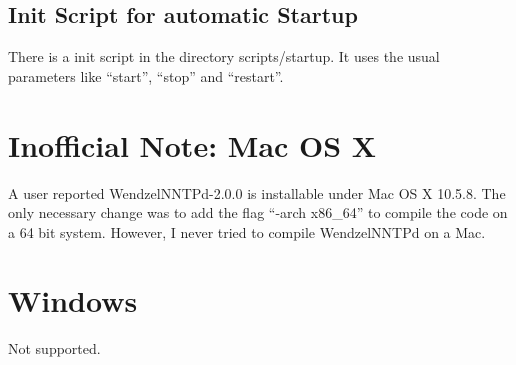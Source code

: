 \subsection{Init Script for automatic Startup}

There is a init script in the directory scripts/startup. It uses the usual parameters like ``start'', ``stop'' and ``restart''.

\section{Inofficial Note: Mac OS X}

A user reported WendzelNNTPd-2.0.0 is installable under Mac OS X 10.5.8. The only necessary change was to add the flag ``-arch x86\_64'' to compile the code on a 64 bit system. However, I never tried to compile WendzelNNTPd on a Mac.

\section{Windows}

Not supported.


